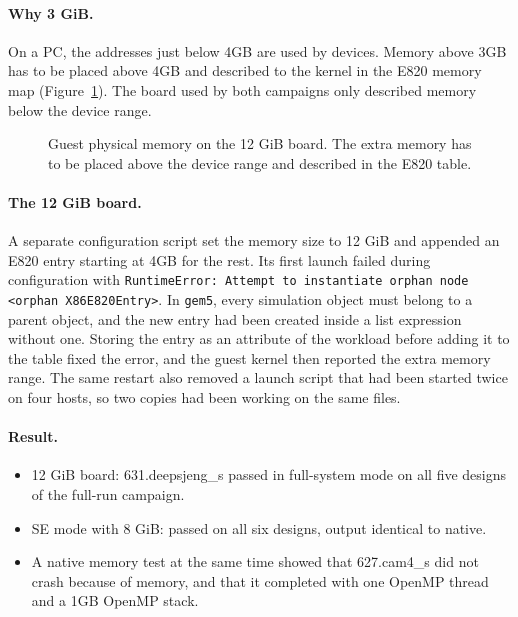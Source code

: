\paragraph{Why 3 GiB.} On a PC, the addresses just below 4GB are used by devices. Memory above 3GB has to be placed above 4GB and described to the kernel in the E820 memory map (Figure~\ref{fig:chr_e820}). The board used by both campaigns only described memory below the device range.

\begin{figure}[H]
\centering
{}
\caption{Guest physical memory on the 12 GiB board. The extra memory has to be placed above the device range and described in the E820 table.}
\label{fig:chr_e820}
\end{figure}

\paragraph{The 12 GiB board.} A separate configuration script set the memory size to 12 GiB and appended an E820 entry starting at 4GB for the rest. Its first launch failed during configuration with \texttt{RuntimeError: Attempt to instantiate orphan node <orphan X86E820Entry>}. In \texttt{gem5}, every simulation object must belong to a parent object, and the new entry had been created inside a list expression without one. Storing the entry as an attribute of the workload before adding it to the table fixed the error, and the guest kernel then reported the extra memory range. The same restart also removed a launch script that had been started twice on four hosts, so two copies had been working on the same files.

\paragraph{Result.}
\begin{itemize}
    \item 12 GiB board: 631.deepsjeng\_s passed in full-system mode on all five designs of the full-run campaign.
    \item SE mode with 8 GiB: passed on all six designs, output identical to native.
    \item A native memory test at the same time showed that 627.cam4\_s did not crash because of memory, and that it completed with one OpenMP thread and a 1GB OpenMP stack.
\end{itemize}

